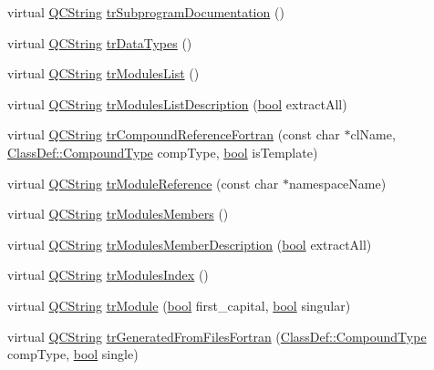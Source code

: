 \begin{DoxyCompactItemize}
virtual \hyperlink{class_q_c_string}{Q\+C\+String} \hyperlink{class_translator_italian_a86f2b4671d62eb9dd5f1ab918bffb08c}{tr\+Subprogram\+Documentation} ()
\item 
virtual \hyperlink{class_q_c_string}{Q\+C\+String} \hyperlink{class_translator_italian_a5b18929b238f5ef28d7e1f246ad02297}{tr\+Data\+Types} ()
\item 
virtual \hyperlink{class_q_c_string}{Q\+C\+String} \hyperlink{class_translator_italian_af971eb2ab94039f51ec210ae60c1f408}{tr\+Modules\+List} ()
\item 
virtual \hyperlink{class_q_c_string}{Q\+C\+String} \hyperlink{class_translator_italian_a4cc931c4b131d90a2fe43aabb8ac0ea7}{tr\+Modules\+List\+Description} (\hyperlink{qglobal_8h_a1062901a7428fdd9c7f180f5e01ea056}{bool} extract\+All)
\item 
virtual \hyperlink{class_q_c_string}{Q\+C\+String} \hyperlink{class_translator_italian_a19e0fc5292ace562b8cd564cde606d61}{tr\+Compound\+Reference\+Fortran} (const char $\ast$cl\+Name, \hyperlink{class_class_def_ae70cf86d35fe954a94c566fbcfc87939}{Class\+Def\+::\+Compound\+Type} comp\+Type, \hyperlink{qglobal_8h_a1062901a7428fdd9c7f180f5e01ea056}{bool} is\+Template)
\item 
virtual \hyperlink{class_q_c_string}{Q\+C\+String} \hyperlink{class_translator_italian_a9de630219d2bc82a336a09e6a9bcf055}{tr\+Module\+Reference} (const char $\ast$namespace\+Name)
\item 
virtual \hyperlink{class_q_c_string}{Q\+C\+String} \hyperlink{class_translator_italian_abf2144ec748424bda890c86cde46bdea}{tr\+Modules\+Members} ()
\item 
virtual \hyperlink{class_q_c_string}{Q\+C\+String} \hyperlink{class_translator_italian_abb595f14406f9fa945e02ddd5ed94c53}{tr\+Modules\+Member\+Description} (\hyperlink{qglobal_8h_a1062901a7428fdd9c7f180f5e01ea056}{bool} extract\+All)
\item 
virtual \hyperlink{class_q_c_string}{Q\+C\+String} \hyperlink{class_translator_italian_a094d4119609a88ad6209b486aab886c4}{tr\+Modules\+Index} ()
\item 
virtual \hyperlink{class_q_c_string}{Q\+C\+String} \hyperlink{class_translator_italian_aa4abaf98353a3cd4dde1fe30e1bd3f60}{tr\+Module} (\hyperlink{qglobal_8h_a1062901a7428fdd9c7f180f5e01ea056}{bool} first\+\_\+capital, \hyperlink{qglobal_8h_a1062901a7428fdd9c7f180f5e01ea056}{bool} singular)
\item 
virtual \hyperlink{class_q_c_string}{Q\+C\+String} \hyperlink{class_translator_italian_ac0128b1da131fea6585acd3cbb7ab7ff}{tr\+Generated\+From\+Files\+Fortran} (\hyperlink{class_class_def_ae70cf86d35fe954a94c566fbcfc87939}{Class\+Def\+::\+Compound\+Type} comp\+Type, \hyperlink{qglobal_8h_a1062901a7428fdd9c7f180f5e01ea056}{bool} single)

\end{DoxyCompactItemize}
